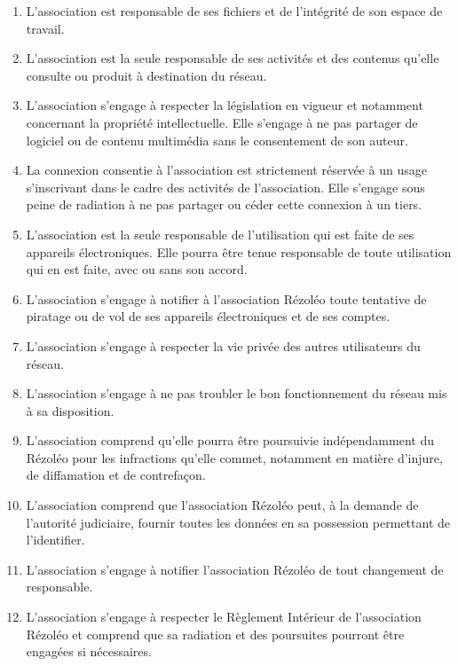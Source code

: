 \documentclass[11pt]{article}
\begin{document}
\begin{enumerate}[leftmargin=*]

\item L'association est responsable de ses fichiers et de l'intégrité de son espace de travail.

\item L'association est la seule responsable de ses activités et des contenus qu'elle consulte ou produit à
destination du réseau.

\item L'association s'engage à respecter la législation en vigueur et notamment concernant la propriété
intellectuelle. Elle s'engage à ne pas partager de logiciel ou de contenu multimédia sans le
consentement de son auteur.

\item La connexion consentie à l'association est strictement réservée à un usage s'inscrivant dans le cadre des activités de l'association. Elle s'engage sous peine de
radiation à ne pas partager ou céder cette connexion à un tiers.

\item L'association est la seule responsable de l'utilisation qui est faite de ses appareils électroniques. Elle
pourra être tenue responsable de toute utilisation qui en est faite, avec ou sans son accord.

\item L'association s'engage à notifier à l'association Rézoléo toute tentative de piratage ou de vol de ses
appareils électroniques et de ses comptes.

\item L'association s'engage à respecter la vie privée des autres utilisateurs du réseau.

\item L'association s'engage à ne pas troubler le bon fonctionnement du réseau mis à sa disposition.

\item L'association comprend qu'elle pourra être poursuivie indépendamment du Rézoléo pour les
infractions qu'elle commet, notamment en matière d'injure, de diffamation et de contrefaçon.

\item L'association comprend que l'association Rézoléo peut, à la demande de l'autorité judiciaire,
fournir toutes les données en sa possession permettant de l'identifier.

\item L'association s'engage à notifier l'association Rézoléo de tout changement de responsable.

\item L'association s'engage à respecter le Règlement Intérieur de l'association Rézoléo et comprend
que sa radiation et des poursuites pourront être engagées si nécessaires.


\end{enumerate}
\end{document}
